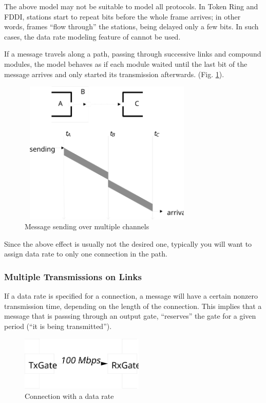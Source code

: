 The above model may not be suitable to model all protocols. In Token Ring
and FDDI, stations start to repeat bits before the whole frame arrives;
in other words, frames ``flow through'' the stations, being delayed only a few bits.
In such cases, the data rate modeling feature of {\opp} cannot be used.

If a message travels along a path, passing through successive links and
compound modules, the model behaves as if each module waited until the
last bit of the message arrives and only started its transmission
afterwards.
(Fig. \ref{fig:ch-overview:msg-multiple-ch}).

\begin{figure}[htbp]
\begin{center}
\includegraphics[width=3.330in, height=2.692in]{figures/simple-messagesend}
\caption{Message sending over multiple channels}
\label{fig:ch-overview:msg-multiple-ch}
\end{center}
\end{figure}

Since the above effect is usually not the desired one, typically
you will want to assign data rate to only one connection in the
path.


\subsubsection{Multiple Transmissions on Links}

If a data rate is specified for a connection, a message
will have a certain nonzero transmission time, depending on the length of the connection. This implies that
a message that is passsing through an output gate, ``reserves'' the gate
for a given period (``it is being transmitted'').

\begin{figure}[htbp]
  \begin{center}
    \includegraphics[width=2.315in, height=1.015in]{figures/simple-conndatarate}
    \caption{Connection with a data rate}
    \label{fig:ch-simple-modules:conn-w-data-rate}
  \end{center}
\end{figure}

